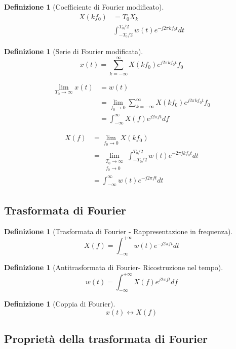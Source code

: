 \documentclass[a4paper,10pt]{article}
\theoremstyle{mystyle}
\newtheorem{definition}[theorem]{Definizione}
\begin{document}
\begin{multicols}{2}
\begin{definition}[Coefficiente di Fourier modificato]
    \begin{align*}
        X(k f_0)
        &= T_0 X_k \\
        & \int_{-T_0 /2}^{T_0/2} w(t) e^{-j 2 \pi k f_0 t} dt
    \end{align*}
\end{definition}

\begin{definition}[Serie di Fourier modificata]
    \[x(t) = \sum_{k=-\infty}^{\infty} X(k f_0) e^{j 2 \pi k f_0 t} f_0\]
\end{definition}

\begin{align*}
    \lim_{T_0 \to \infty} x(t) 
    &= w(t) \\
    &= \lim_{f_0 \to 0} \sum_{k=-\infty}^{\infty} X(k f_0) e^{j 2 \pi k f_0 t} f_0 \\
    &= \int_{-\infty}^{\infty} X(f) e^{j2 \pi f t} df
\end{align*}


\begin{align*}
    X(f)
    &= \lim_{f_0 \to 0} X(k f_0) \\
    &= \lim_{\substack{T_0 \to \infty \\ f_0 \to 0}} \int_{-T_0 /2}^{T_0 /2} w(t) e^{-2 \pi j k f_0 t} dt \\
    &= \int_{-\infty}^{\infty} w(t) e^{-j2 \pi f t} dt
\end{align*}

\subsection{Trasformata di Fourier}
\begin{definition}[Trasformata di Fourier - Rappresentazione in frequenza]
    \[
        X(f) = \int_{-\infty}^{+\infty} w(t) e^{-j2\pi f t} dt
    \]
\end{definition}

\begin{definition}[Antitrasformata di Fourier- Ricostruzione nel tempo]
    \[
        w(t) = \int_{-\infty}^{+\infty} X(f) e^{j 2 \pi f t} df
    \]
\end{definition}

\begin{definition}[Coppia di Fourier]
    \[x(t) \leftrightarrow X(f)\]
\end{definition}

\subsection{Proprietà della trasformata di Fourier}


\end{multicols}
\end{document}
